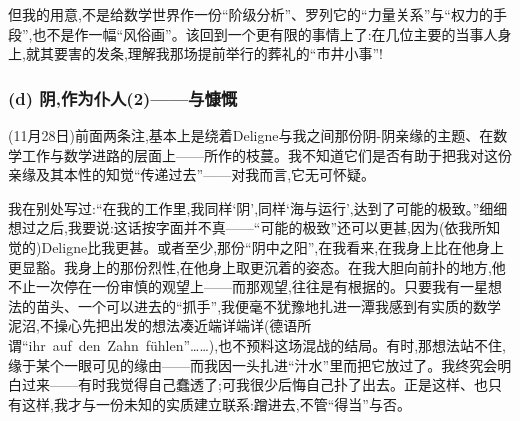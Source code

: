 但我的用意,不是给数学世界作一份“阶级分析”、罗列它的“力量关系”与“权力的手段”,也不是作一幅“风俗画”。该回到一个更有限的事情上了:在几位主要的当事人身上,就其要害的发条,理解我那场提前举行的葬礼的“市井小事”!

\subsubsection*{(d) 阴,作为仆人(2)——与慷慨}
\label{ch18:local:h47}

\label{ch18:local:n43}

(11月28日)前面两条注,基本上是绕着Deligne与我之间那份阴-阴亲缘的主题、在数学工作与数学进路的层面上——所作的枝蔓。我不知道它们是否有助于把我对这份亲缘及其本性的知觉“传递过去”——对我而言,它无可怀疑。

我在别处写过:“在我的工作里,我同样‘阴’,同样‘海与运行’,达到了可能的极致。”细细想过之后,我要说:这话按字面并不真——“可能的极致”还可以更甚,因为(依我所知觉的)Deligne比我更甚。或者至少,那份“阴中之阳”,在我看来,在我身上比在他身上更显豁。我身上的那份烈性,在他身上取更沉着的姿态。在我大胆向前扑的地方,他不止一次停在一份审慎的观望上——而那观望,往往是有根据的。只要我有一星想法的苗头、一个可以进去的“抓手”,我便毫不犹豫地扎进一潭我感到有实质的数学泥沼,不操心先把出发的想法凑近端详端详(德语所谓“ihr~auf~den~Zahn~fühlen”……),也不预料这场混战的结局。有时,那想法站不住,缘于某个一眼可见的缘由——而我因一头扎进“汁水”里而把它放过了。我终究会明白过来——有时我觉得自己蠢透了;可我很少后悔自己扑了出去。正是这样、也只有这样,我才与一份未知的实质建立联系:蹭进去,不管“得当”与否。

